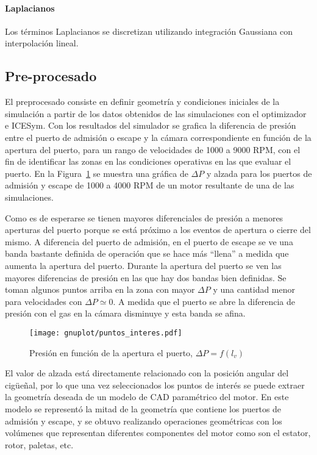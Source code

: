 \paragraph{Laplacianos}
%
Los términos Laplacianos se discretizan utilizando integración Gaussiana con
interpolación lineal.



\subsection{Pre-procesado}
%
El preprocesado consiste en definir geometría y condiciones iniciales de la
simulación a partir de los datos obtenidos de las simulaciones con el
optimizador e ICESym.
%
Con los resultados del simulador se grafica la diferencia de presión entre el
puerto de admisión o escape y la cámara correspondiente en función de la apertura
del puerto, para un rango de velocidades de 1000 a 9000 RPM, con el fin de
identificar las zonas en las condiciones operativas en las que evaluar el puerto.
%
En la Figura~\ref{fig:puntos_interes} se muestra una gráfica de $\Delta P$ y
alzada para los puertos de admisión y escape de 1000 a 4000 RPM de un motor
resultante de una de las simulaciones.

Como es de esperarse se tienen mayores diferenciales de presión a menores
aperturas del puerto porque se está próximo a los eventos de apertura o cierre
del mismo.
%
A diferencia del puerto de admisión, en el puerto de escape se ve una banda
bastante definida de operación que se hace más ``llena'' a medida que aumenta la
apertura del puerto.
%
Durante la apertura del puerto se ven las mayores diferencias de presión en las
que hay dos bandas bien definidas.
%
Se toman algunos puntos arriba en la zona con mayor $\Delta P$ y una cantidad
menor para velocidades con $\Delta P \simeq 0$.
%
A medida que el puerto se abre la diferencia de presión con el gas en la cámara
disminuye y esta banda se afina.

\begin{figure}
    \centering
    \texttt{[image: gnuplot/puntos\_interes.pdf]}
    \caption{Presión en función de la apertura el puerto,
$\Delta P = f(l_{v})$}\label{fig:puntos_interes}
\end{figure}

El valor de alzada está directamente relacionado con la posición angular del
cigüeñal, por lo que una vez seleccionados los puntos de interés se puede
extraer la geometría deseada de un modelo de CAD paramétrico del motor.
%
En este modelo se representó la mitad de la geometría que contiene los puertos
de admisión y escape, y se obtuvo realizando operaciones geométricas con los
volúmenes que representan diferentes componentes del motor como son el estator,
rotor, paletas, etc.
%

